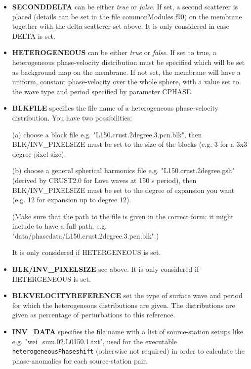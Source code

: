 \documentclass[a4paper,
                          headsepline,
                          listof=totoc,
                          toc=listof,
                          headings=small]{scrreprt} %
\begin{document}
\begin{itemize}
\item \textbf{SECONDDELTA}
can be either \textit{true} or \textit{false}. If set, a second scatterer is placed (details
can be set in the file commonModules.f90) on the membrane
together with the delta scatterer set above. It is only considered in case DELTA is set.

\item \textbf{HETEROGENEOUS}
can be either \textit{true} or \textit{false}. If set to true, a heterogeneous phase-velocity distribution must be specified which will be set as background map on the membrane.
If not set, the membrane will have a uniform, constant phase-velocity over the whole sphere, with a value set to the wave type and period specified by parameter CPHASE.

\item \textbf{BLKFILE}
specifies the file name of a heterogeneous phase-velocity distribution.
You have two possibilities:

(a) choose a block file e.g. "L150.crust.2degree.3.pcn.blk", then BLK/INV\_PIXELSIZE must be set to the size of the blocks (e.g. 3 for a 3x3 degree pixel size).

(b) choose a general spherical harmonics file e.g. "L150.crust.2degree.gsh" (derived by CRUST2.0 for Love waves at 150 s period), then BLK/INV\_PIXELSIZE must be set to the degree of expansion you want (e.g. 12 for expansion up to degree 12).

(Make sure that the path to the file is given in the correct form: it might include to have a full path, e.g.\\
"data/phasedata/L150.crust.2degree.3.pcn.blk".)

It is only considered if HETERGENEOUS is set.

\item \textbf{BLK/INV\_PIXELSIZE}
see above. It is only considered if HETERGENEOUS is set.

\item \textbf{BLKVELOCITYREFERENCE}
set the type of surface wave and period for which the heterogeneous distributions
are given. The distributions are given as percentage of perturbations to this reference.

\item \textbf{INV\_DATA}
specifies the file name with a list of source-station setups
like e.g. "wei\_sum.02.L0150.1.txt",
used for the executable \texttt{heterogeneousPhaseshift} (otherwise not required)
in order to calculate the phase-anomalies for each source-station pair.


\end{itemize}
\end{document}
